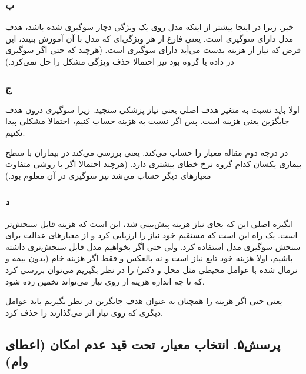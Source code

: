 \subsubsection{ب}
خیر. زیرا در اینجا بیشتر از اینکه مدل روی یک ویژگی دچار سوگیری شده باشد، هدف مدل دارای سوگیری است. یعنی فارغ از هر ویژگی‌ای که مدل با آن آموزش ببیند، این فرض که نیاز از هزینه بدست می‌آید دارای سوگیری است. (هرچند که حتی اگر سوگیری در داده یا گروه بود نیز احتمالا حذف ویژگی مشکل را حل نمی‌کرد.)

\subsubsection{ج}
اولا باید نسبت به متغیر هدف اصلی یعنی نیاز پزشکی سنجید. زیرا سوگیری درون هدف جایگزین یعنی هزینه است. پس اگر نسبت به هزینه حساب کنیم، احتمالا مشکلی پیدا نکنیم.

در درجه دوم مقاله معیار 
را حساب می‌کند. یعنی بررسی می‌کند در بیماران با سطح بیماری یکسان کدام گروه نرخ خطای بیشتری دارد.  (هرچند احتمالا اگر با روشی متفاوت معیارهای دیگر حساب می‌شد نیز سوگیری در آن معلوم بود.)

\subsubsection{د}
انگیزه اصلی این که بجای نیاز هزینه پیش‌بینی شد، این است که هزینه قابل سنجش‌تر است. یک راه این است که مستقیم خود نیاز را ارزیابی کرد و از معیارهای عدالت برای سنجش سوگیری مدل استفاده کرد. ولی حتی اگر بخواهیم مدل قابل سنجش‌تری داشته باشیم، اولا هزینه خود تابع نیاز است و نه بالعکس و فقط اگر هزینه خام (بدون بیمه و نرمال شده با عوامل محیطی مثل محل و دکتر) را در نظر بگیریم می‌توان بررسی کرد که تا چه اندازه هزینه از روی نیاز می‌تواند تخمین زده شود. 

یعنی حتی اگر هزینه را همچنان به عنوان هدف جایگزین در نظر بگیریم باید عوامل دیگری که روی نیاز اثر می‌گذارند را حذف کرد.
\subsection{پرسش۵. انتخاب معیار، تحت قید عدم امکان (اعطای وام)}
